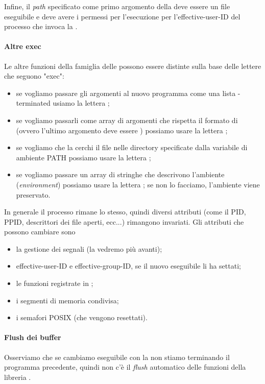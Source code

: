 Infine, il \emph{path} specificato come primo argomento della  deve essere un file eseguibile e deve avere i permessi per l'esecuzione per l'effective-user-ID del processo che invoca la .

\paragraph{Altre exec}
Le altre funzioni della famiglia delle  possono essere distinte sulla base delle lettere che seguono "exec":
\begin{itemize}
    \item se vogliamo passare gli argomenti al nuovo programma come una lista -terminated usiamo la lettera ;
    \item se vogliamo passarli come array di argomenti che rispetta il formato di  (ovvero l'ultimo argomento deve essere ) possiamo usare la lettera ;
    \item se vogliamo che la  cerchi il file nelle directory specificate dalla variabile di ambiente \textsf{PATH} possiamo usare la lettera ;
    \item se vogliamo passare un array di stringhe che descrivono l'ambiente (\emph{environment}) possiamo usare la lettera ; se non lo facciamo, l'ambiente viene preservato.
\end{itemize}

In generale il processo rimane lo stesso, quindi diversi attributi (come il \textsf{PID}, \textsf{PPID}, descrittori dei file aperti, ecc...) rimangono invariati. Gli attributi che possono cambiare sono \begin{itemize}
    \item la gestione dei segnali (la vedremo più avanti);
    \item effective-user-ID e effective-group-ID, se il nuovo eseguibile li ha settati;
    \item le funzioni registrate in ;
    \item i segmenti di memoria condivisa;
    \item i semafori POSIX (che vengono resettati).
\end{itemize}

\paragraph{Flush dei buffer}
Osserviamo che se cambiamo eseguibile con la  non stiamo terminando il programma precedente, quindi non c'è il \emph{flush} automatico delle funzioni della libreria . 

